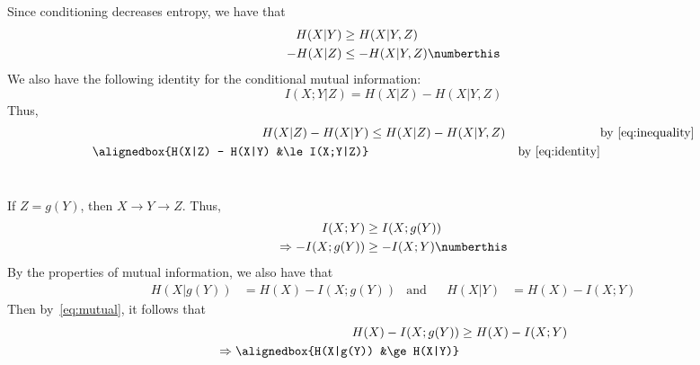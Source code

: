 \documentclass[
  coursecode={MTHE 474},
  assignmentname={Homework \homeworknumber},
  studentnumber=20053722,
  name={Bryan Hoang}
]{
  ltxanswer%
}
\begin{document}
  \begin{questions}
    \setcounter{question}{\questionnumber}
    \addtocounter{question}{-1}
    \question{}
    \begin{parts}
      \part{}
      \begin{solution}
        Since conditioning decreases entropy, we have that
        \begin{align*}
          H(X|Y)  &\ge H(X|Y,Z)                                  \\
          -H(X|Z) &\le -H(X|Y,Z)\numberthis\label{eq:inequality}
        \end{align*}
        We also have the following identity for the conditional mutual information:
        \begin{equation}\label{eq:identity}
          I(X;Y|Z) = H(X|Z) - H(X|Y,Z)
        \end{equation}
        Thus,
        \begin{align*}
          H(X|Z) - H(X|Y)             &\le H(X|Z) - H(X|Y,Z) & &\text{by~\eqref{eq:inequality}} \\
          \alignedbox{H(X|Z) - H(X|Y) &\le I(X;Y|Z)}         & &\text{by~\eqref{eq:identity}}
        \end{align*}
      \end{solution}

      \part{}
      \begin{solution}
        If \(Z = g(Y)\), then \(X \rightarrow Y \rightarrow Z\). Thus,
        \begin{align*}
          I(X;Y)                 &\ge I(X;g(Y))                           \\
          \Rightarrow -I(X;g(Y)) &\ge -I(X;Y)\numberthis\label{eq:mutual}
        \end{align*}
        By the properties of mutual information, we also have that
        \begin{align*}
          H(X|g(Y)) &= H(X) - I(X;g(Y)) &\text{and} & &H(X|Y) &= H(X) - I(X;Y)
        \end{align*}
        Then by~\eqref{eq:mutual}, it follows that
        \begin{align*}
          H(X) - I(X;g(Y))                  &\ge H(X) - I(X;Y) \\
          \Rightarrow \alignedbox{H(X|g(Y)) &\ge H(X|Y)}
        \end{align*}
      \end{solution}


\end{parts}
\end{questions}
\end{document}
